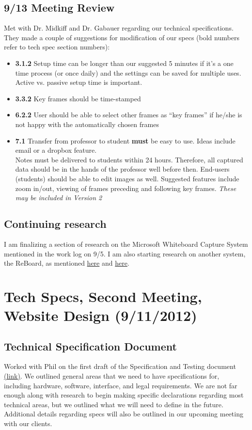 \documentclass[]{article}
\begin{document}
{		\subsection*{9/13 Meeting Review}
Met with Dr. Midkiff and Dr. Gabauer regarding our technical specifications.  They made a couple of suggestions for modification of our specs (bold numbers refer to tech spec section numbers):
\begin{itemize}
\item \textbf{3.1.2} Setup time can be longer than our suggested 5 minutes if it's a one time process (or once daily) and the settings can be saved for multiple uses. Active vs. passive setup time is important.
\item \textbf{3.3.2} Key frames should be time-stamped
\item \textbf{6.2.2} User should be able to select other frames as ``key frames'' if he/she is not happy with the automatically chosen frames
\item \textbf{7.1} Transfer from professor to student \textbf{must} be easy to use.  Ideas include email or a dropbox feature. \\  
\indent Notes must be delivered to students within 24 hours.  Therefore, all captured data should be in the hands of the professor well before then. \newline
\hspace{0.1in} End-users (students) should be able to edit images as well. Suggested features include zoom in/out, viewing of frames preceding and following key frames.  \sl{These may be included in Version 2}
\end{itemize}
		\subsection*{Continuing research}
I am finalizing a section of research on the Microsoft Whiteboard Capture System mentioned in the work log on 9/5.  I am also starting research on another system, the ReBoard, as mentioned \href{http://www.fxpal.com/publications/FXPAL-PR-10-546.pdf}{here} and \href{http://www.fxpal.com/?p=reboard}{here}.  
		

	\section{Tech Specs, Second Meeting, Website Design (9/11/2012)}

		\subsection*{Technical Specification Document}
		Worked with Phil on the first draft of the Specification and Testing document \href{https://docs.google.com/viewer?a=v&pid=sites&srcid=ZGVmYXVsdGRvbWFpbnxidXByb3BhbmV8Z3g6NjhkOWVjMjIyZjY3ZTM4ZA}{(link)}.  We outlined general areas that we need to have specifications for, including hardware, software, interface, and legal requirements.  We are not far enough along with research to begin making specific declarations regarding most technical areas, but we outlined what we will need to define in the future.  Additional details regarding specs will also be outlined in our upcoming meeting with our clients.

}
\end{document}
